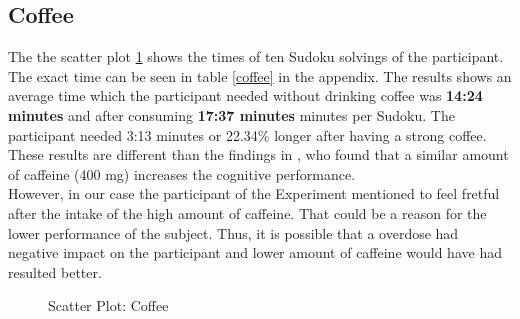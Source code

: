 \FloatBarrier
\subsection{Coffee}
The the scatter plot \ref{coffeeGraph} shows the times of ten Sudoku solvings of the participant. The exact time can be seen in table \ref{coffee} in the appendix.
\bigbreak
The results shows an average time which the participant needed without drinking coffee was \textbf{14:24 minutes} and after consuming \textbf{17:37 minutes} minutes per Sudoku. The participant needed 3:13 minutes or 22.34\%  longer after having a strong coffee.\\
These results are different than the findings in \cite{liguori1997absorption}, who found that a similar amount of caffeine (400 mg) increases the cognitive performance. \\
However, in our case the participant of the Experiment mentioned to feel fretful after the intake of the high amount of caffeine. That could be a reason for the lower performance of the subject. Thus, it is possible that a overdose had negative impact on the participant and lower amount of caffeine would have had resulted better. 

\begin{figure}
\caption{Scatter Plot: Coffee} \label{coffeeGraph}
\end{figure}

